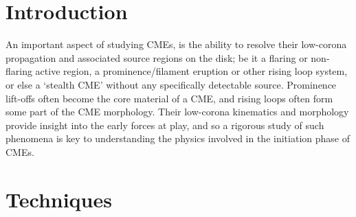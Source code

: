 \documentclass[preprint2]{aastex}
\begin{document}

\section{Introduction}

An important aspect of studying CMEs, is the ability to resolve their low-corona propagation and associated source regions on the disk; be it a flaring or non-flaring active region, a prominence/filament eruption or other rising loop system, or else a `stealth CME' without any specifically detectable source. Prominence lift-offs often become the core material of a CME, and rising loops often form some part of the CME morphology. Their low-corona kinematics and morphology provide insight into the early forces at play, and so a rigorous study of such phenomena is key to understanding the physics involved in the initiation phase of CMEs.

\section{Techniques}
\end{document}
